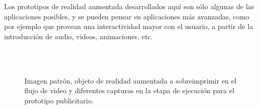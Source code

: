 Los prototipos de realidad aumentada desarrollados aquí son sólo algunas de las aplicaciones posibles, y se pueden pensar en aplicaciones más avanzadas, como por ejemplo que provean una interactividad mayor con el usuario, a partir de la introducción de audio, videos, animaciones, etc.
\begin{figure}
\centering
{}
\\
\\
\caption[Capturas en la etapa de ejecución para el prototipo publicitario]{Imagen patrón, objeto de realidad aumentada a sobreimprimir en el flujo de video y diferentes capturas en la etapa de ejecución para el prototipo publicitario.}
\label{fig:ejemplos_protitipos}
\end{figure}